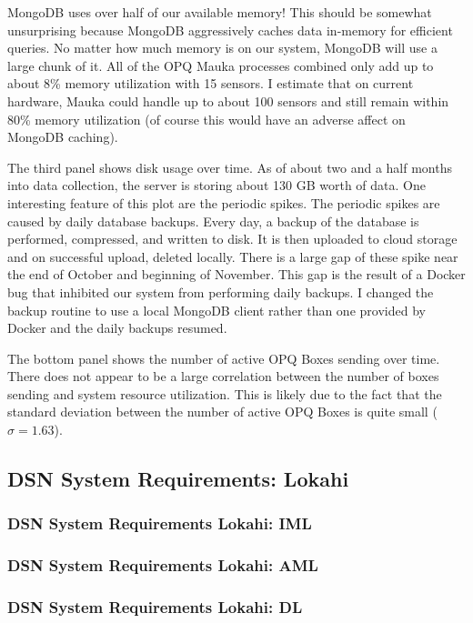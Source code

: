 MongoDB uses over half of our available memory! This should be somewhat unsurprising because MongoDB aggressively caches data in-memory for efficient queries. No matter how much memory is on our system, MongoDB will use a large chunk of it. All of the OPQ Mauka processes combined only add up to about 8\% memory utilization with 15 sensors. I estimate that on current hardware, Mauka could handle up to about 100 sensors and still remain within 80\% memory utilization (of course this would have an adverse affect on MongoDB caching).

The third panel shows disk usage over time. As of about two and a half months into data collection, the server is storing about 130 GB worth of data. One interesting feature of this plot are the periodic spikes. The periodic spikes are caused by daily database backups. Every day, a backup of the database is performed, compressed, and written to disk. It is then uploaded to cloud storage and on successful upload, deleted locally. There is a large gap of these spike near the end of October and beginning of November. This gap is the result of a Docker bug that inhibited our system from performing daily backups. I changed the backup routine to use a local MongoDB client rather than one provided by Docker and the daily backups resumed.

The bottom panel shows the number of active OPQ Boxes sending over time. There does not appear to be a large correlation between the number of boxes sending and system resource utilization. This is likely due to the fact that the standard deviation between the number of active OPQ Boxes is quite small ($\sigma=1.63$).

\subsection{DSN System Requirements: Lokahi}\label{subsec:dsn-system-requirements:-lokahi}

\subsubsection{DSN System Requirements Lokahi: IML}

\subsubsection{DSN System Requirements Lokahi: AML}

\subsubsection{DSN System Requirements Lokahi: DL}

